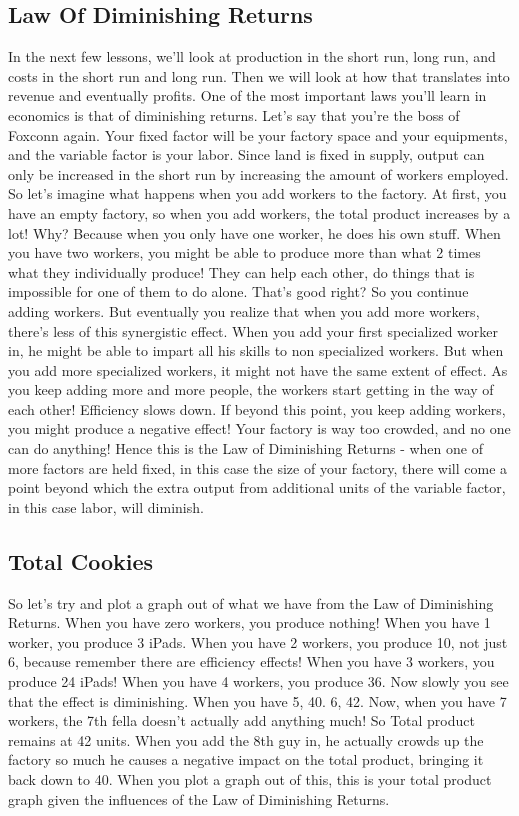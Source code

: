 \subsection{Law Of Diminishing Returns}
In the next few lessons, we'll look at production in the short run, long run, and costs in the short run and long run. Then we will look at how that translates into revenue and eventually profits. One of the most important laws you'll learn in economics is that of diminishing returns. Let's say that you're the boss of Foxconn again. Your fixed factor will be your factory space and your equipments, and the variable factor is your labor. Since land is fixed in supply, output can only be increased in the short run by increasing the amount of workers employed. So let's imagine what happens when you add workers to the factory. At first, you have an empty factory, so when you add workers, the total product increases by a lot! Why? Because when you only have one worker, he does his own stuff. When you have two workers, you might be able to produce more than what 2 times what they individually produce! They can help each other, do things that is impossible for one of them to do alone. That's good right? So you continue adding workers. But eventually you realize that when you add more workers, there's less of this synergistic effect. When you add your first specialized worker in, he might be able to impart all his skills to non specialized workers. But when you add more specialized workers, it might not have the same extent of effect. As you keep adding more and more people, the workers start getting in the way of each other! Efficiency slows down. If beyond this point, you keep adding workers, you might produce a negative effect! Your factory is way too crowded, and no one can do anything! Hence this is the Law of Diminishing Returns - when one of more factors are held fixed, in this case the size of your factory, there will come a point beyond which the extra output from additional units of the variable factor, in this case labor, will diminish.
\subsection{Total Cookies}
So let's try and plot a graph out of what we have from the Law of Diminishing Returns. When you have zero workers, you produce nothing! When you have 1 worker, you produce 3 iPads. When you have 2 workers, you produce 10, not just 6, because remember there are efficiency effects! When you have 3 workers, you produce 24 iPads! When you have 4 workers, you produce 36. Now slowly you see that the effect is diminishing. When you have 5, 40. 6, 42. Now, when you have 7 workers, the 7th fella doesn't actually add anything much! So Total product remains at 42 units. When you add the 8th guy in, he actually crowds up the factory so much he causes a negative impact on the total product, bringing it back down to 40. When you plot a graph out of this, this is your total product graph given the influences of the Law of Diminishing Returns.
